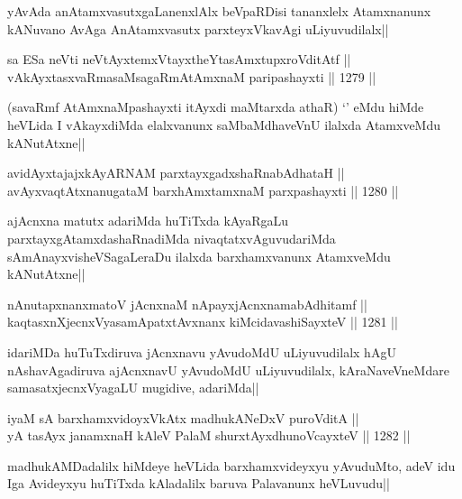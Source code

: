 \begin{artha}
yAvAda anAtamxvasutxgaLanenxlAlx beVpaRDisi tananxlelx Atamxnanunx kANuvano AvAga AnAtamxvasutx parxteyxVkavAgi uLiyuvudilalx||
\end{artha}

\begin{shl}
sa ESa neVti neVtAyxtemxVtayxtheYtasAmxtupxroVditAtf || \\
vAkAyxtasxvaRmasaMsagaRmAtAmxnaM paripashayxti ||  1279 || 
\end{shl}

\begin{artha}
(savaRmf AtAmxnaMpashayxti itAyxdi maMtarxda athaR) `\stext' eMdu hiMde heVLida I vAkayxdiMda elalxvanunx saMbaMdhaveVnU ilalxda AtamxveMdu kANutAtxne||
\end{artha}

\begin{shl}
avidAyxtajajxkAyARNAM parxtayxgadxshaRnabAdhataH || \\
avAyxvaqtAtxnanugataM barxhAmxtamxnaM parxpashayxti ||  1280 ||  
\end{shl}

\begin{artha}
ajAcnxna matutx adariMda huTiTxda kAyaRgaLu parxtayxgAtamxdashaRnadiMda nivaqtatxvAguvudariMda sAmAnayxvisheVSagaLeraDu ilalxda barxhamxvanunx AtamxveMdu kANutAtxne||
\end{artha}

\begin{shl}
nAnutapxnanxmatoV jAcnxnaM nApayxjAcnxnamabAdhitamf ||  \\
kaqtasxnXjecnxVyasamApatxtAvxnanx kiMcidavashiSayxteV ||  1281 ||  
\end{shl}

\begin{artha}
idariMDa huTuTxdiruva jAcnxnavu yAvudoMdU uLiyuvudilalx hAgU nAshavAgadiruva ajAcnxnavU yAvudoMdU uLiyuvudilalx, kAraNaveVneMdare samasatxjecnxVyagaLU mugidive, adariMda||
\end{artha}

\begin{shl}
iyaM sA barxhamxvidoyxVkAtx madhukANeDxV puroVditA ||  \\
yA tasAyx janamxnaH kAleV PalaM shurxtAyx\s dhunoVcayxteV || 1282 ||  
\end{shl}

\begin{artha}
madhukAMDadalilx hiMdeye heVLida barxhamxvideyxyu yAvuduMto, adeV idu Iga Avideyxyu huTiTxda kAladalilx baruva Palavanunx heVLuvudu||
\end{artha}

